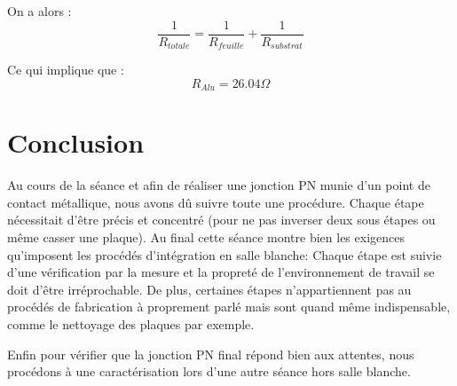 \documentclass[11pt]{article}
\begin{document}
On a alors :
\[
	\frac{1}{R_{totale}} = \frac{1}{R_{feuille}} + \frac{1}{R_{substrat}} 
\]

Ce qui implique que :
\[
	R_{Alu} = 26.04 \Omega
\]

\clearpage

\section{Conclusion}

Au cours de la s\'eance et afin de r\'ealiser une jonction PN munie d'un point de contact m\'etallique, nous avons d\^u suivre toute une proc\'edure. Chaque \'etape n\'ecessitait d'\^etre pr\'ecis et concentr\'e (pour ne pas inverser deux sous \'etapes ou m\^eme casser une plaque). Au final cette s\'eance montre bien les exigences qu'imposent les proc\'ed\'es d'int\'egration en salle blanche: Chaque \'etape est suivie d'une v\'erification par la mesure et la propret\'e de l'environnement de travail se doit d'\^etre irr\'eprochable. De plus, certaines \'etapes n'appartiennent pas au proc\'ed\'es de fabrication \`a proprement parl\'e mais sont quand m\^eme indispensable, comme le nettoyage des plaques par exemple.

Enfin pour v\'erifier que la jonction PN final r\'epond bien aux attentes, nous proc\'edons \`a une caract\'erisation lors d'une autre s\'eance hors salle blanche.
\end{document}

